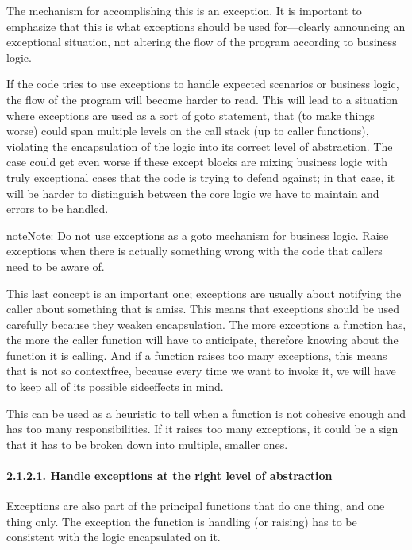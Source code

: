 \documentclass[a4paper,10pt,english]{sphinxmanual}
\begin{document}
The mechanism for accomplishing this is an exception. It is important to emphasize that this is what
exceptions should be used for—clearly announcing an exceptional situation, not altering the flow of the
program according to business logic.

If the code tries to use exceptions to handle expected scenarios or business logic, the flow of the program
will become harder to read. This will lead to a situation where exceptions are used as a sort of go\sphinxhyphen{}to
statement, that (to make things worse) could span multiple levels on the call stack (up to caller functions),
violating the encapsulation of the logic into its correct level of abstraction. The case could get even worse
if these except blocks are mixing business logic with truly exceptional cases that the code is trying to
defend against; in that case, it will be harder to distinguish between the core logic we have to maintain and
errors to be handled.

\begin{sphinxadmonition}{note}{Note:}
Do not use exceptions as a go\sphinxhyphen{}to mechanism for business logic. Raise exceptions when there is
actually something wrong with the code that callers need to be aware of.
\end{sphinxadmonition}

This last concept is an important one; exceptions are usually about notifying the caller about something that
is amiss. This means that exceptions should be used carefully because they weaken encapsulation. The more
exceptions a function has, the more the caller function will have to anticipate, therefore knowing about the
function it is calling. And if a function raises too many exceptions, this means that is not so context\sphinxhyphen{}free,
because every time we want to invoke it, we will have to keep all of its possible side\sphinxhyphen{}effects in mind.

This can be used as a heuristic to tell when a function is not cohesive enough and has too many
responsibilities. If it raises too many exceptions, it could be a sign that it has to be broken down into
multiple, smaller ones.


\paragraph{2.1.2.1. Handle exceptions at the right level of abstraction}
\label{\detokenize{chapters/3_general_traits/index:handle-exceptions-at-the-right-level-of-abstraction}}
Exceptions are also part of the principal functions that do one thing, and one thing only. The exception the
function is handling (or raising) has to be consistent with the logic encapsulated on it.
\end{document}
